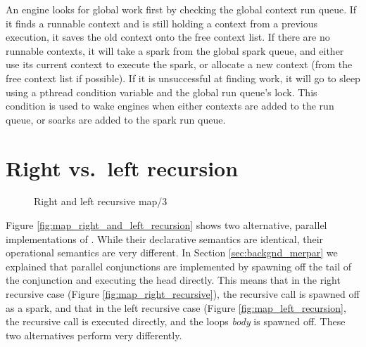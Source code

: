 An engine looks for global work first by checking the global context run queue.
If it finds a runnable context and is still holding a context from a
previous execution, it saves the old context onto the free context list.
If there are no runnable contexts,
it will take a spark from the global spark queue,
and either use its current context to execute the spark,
or allocate a new context (from the free context list if possible).
If it is unsuccessful at finding work,
it will go to sleep using a pthread condition variable and the global run
queue's lock.
This condition is used to wake engines when either contexts are added to the
run queue,
or soarks are added to the spark run queue.

\section{Right vs.\ left recursion}

\begin{figure}
\begin{center}
%
\end{center}
\caption{Right and left recursive map/3}
\label{fig:map_right_and_left_recursive}
\end{figure}

Figure \ref{fig:map_right_and_left_recursion} shows two alternative, parallel
implementations of .
While their declarative semantics are identical,
their operational semantics are very different.  In Section
\ref{sec:backgnd_merpar} we explained that parallel conjunctions are
implemented by spawning off the tail of the conjunction and executing the
head directly.
This means that in the right recursive case (Figure
\ref{fig:map_right_recursive}), the recursive call is spawned off as a
spark,
and that in the left recursive case (Figure \ref{fig:map_left_recursion},
the recursive call is executed directly, and the loops \emph{body} is
spawned off.
These two alternatives perform very differently.


